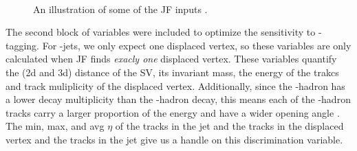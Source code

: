 \def\figpath{figures/ftag/ANA-FTAG-2019-07-PAPER/jetfitter}
\begin{figure}[htbp]
\centering
{} 
      \\ 
\caption{An illustration of some of the JF inputs \cite{ANA-FTAG-2019-07}.}
\label{fig:jf-inputs}
\end{figure}


The second block of variables were included to optimize the sensitivity to \Pqc-tagging. For \Pqb-jets, we only expect one displaced vertex, so these variables are only calculated when JF finds \emph{exacly one} displaced vertex. These variables quantify the (2d and 3d) distance of the SV, its invariant mass, the energy of the trakcs and track muliplicity of the displaced vertex. 
Additionally, since the \Pqc-hadron has a lower decay multiplicity than the \Pqb-hadron decay, this means each of the \Pqc-hadron tracks carry a larger proportion of the energy and have a wider opening angle \cite{ATL-PHYS-PUB-2017-013}. 
The min, max, and avg $\eta$ of the tracks in the jet and the tracks in the displaced vertex and the tracks in the jet give us a handle on this discrimination variable.

